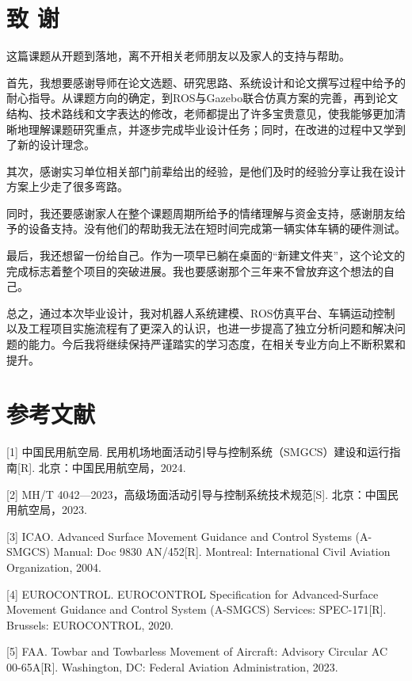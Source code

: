 \documentclass[UTF8,a4paper,12pt]{ctexart}
\begin{document}
\section*{致 谢}\label{_Toc228997229}

这篇课题从开题到落地，离不开相关老师朋友以及家人的支持与帮助。

首先，我想要感谢导师在论文选题、研究思路、系统设计和论文撰写过程中给予的耐心指导。从课题方向的确定，到ROS与Gazebo联合仿真方案的完善，再到论文结构、技术路线和文字表达的修改，老师都提出了许多宝贵意见，使我能够更加清晰地理解课题研究重点，并逐步完成毕业设计任务；同时，在改进的过程中又学到了新的设计理念。

其次，感谢实习单位相关部门前辈给出的经验，是他们及时的经验分享让我在设计方案上少走了很多弯路。

同时，我还要感谢家人在整个课题周期所给予的情绪理解与资金支持，感谢朋友给予的设备支持。没有他们的帮助我无法在短时间完成第一辆实体车辆的硬件测试。

最后，我还想留一份给自己。作为一项早已躺在桌面的``新建文件夹''，这个论文的完成标志着整个项目的突破进展。我也要感谢那个三年来不曾放弃这个想法的自己。

总之，通过本次毕业设计，我对机器人系统建模、ROS仿真平台、车辆运动控制以及工程项目实施流程有了更深入的认识，也进一步提高了独立分析问题和解决问题的能力。今后我将继续保持严谨踏实的学习态度，在相关专业方向上不断积累和提升。

\section*{参考文献}\label{_Toc229105361}

{[}1{]} 中国民用航空局. 民用机场地面活动引导与控制系统（SMGCS）建设和运行指南{[}R{]}. 北京：中国民用航空局，2024.

{[}2{]} MH/T 4042---2023，高级场面活动引导与控制系统技术规范{[}S{]}. 北京：中国民用航空局，2023.

{[}3{]} ICAO. Advanced Surface Movement Guidance and Control Systems (A-SMGCS) Manual: Doc 9830 AN/452{[}R{]}. Montreal: International Civil Aviation Organization, 2004.

{[}4{]} EUROCONTROL. EUROCONTROL Specification for Advanced-Surface Movement Guidance and Control System (A-SMGCS) Services: SPEC-171{[}R{]}. Brussels: EUROCONTROL, 2020.

{[}5{]} FAA. Towbar and Towbarless Movement of Aircraft: Advisory Circular AC 00-65A{[}R{]}. Washington, DC: Federal Aviation Administration, 2023.
\end{document}
